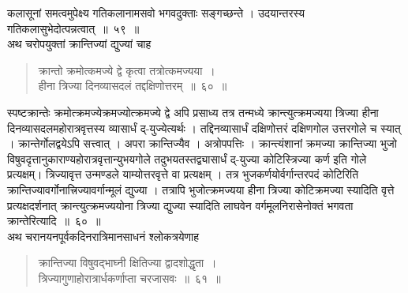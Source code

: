 \documentclass[11pt, openany]{book}
\begin{document}
\begin{sloppypar}
\noindent कलासूनां समत्वमुपेक्ष्य गतिकलानामसवो भगवदुक्ताः सङ्गच्छन्ते । उदयान्तरस्य गतिकलासुभेदोत्पन्नत्वात्~॥~५९~॥\\
\noindent अथ चरोपयुक्तां क्रान्तिज्यां द्युज्यां चाह\textendash
\end{sloppypar}
\begin{quote}

{\ssi क्रान्तो क्रमोत्कमज्ये द्वे कृत्वा तत्रोत्कमज्यया~।\\
हीना त्रिज्या दिनव्यासदलं तद्दक्षिणोत्तरम्~॥~६०~॥}
\end{quote}
\begin{sloppypar}
स्पष्टक्रान्तेः क्रमोत्क्रमज्येक्रमज्योत्क्रमज्ये द्वे अपि प्रसाध्य तत्र
तन्मध्ये क्रान्त्युत्क्रमज्यया त्रिज्या हीना दिनव्यासदलमहोरात्रवृत्तस्य व्यासार्धं द्-युज्येत्यर्थः । तद्दिनव्यासार्धं दक्षिणोत्तरं दक्षिणगोल उत्तरगोले च स्यात् । क्रान्तेर्गोलद्वयेऽपि सत्त्वात् । अपरा क्रान्तिज्यैव । अत्रोपपत्तिः । क्रान्त्यंशानां क्रमज्या क्रान्तिज्या भुजो विषुवदृत्तानुकाराण्यहोरात्रवृत्तान्युभयगोले तदुभयतस्तद्व्यासार्धं द्-युज्या कोटिस्त्रिज्या कर्ण इति गोले प्रत्यक्षम्। त्रिज्यावृत्त उन्मण्डले याम्योत्तरवृत्ते वा प्रत्यक्षम् । तत्र भुजकर्णयोर्वर्गान्तरपदं कोटिरिति क्रान्तिज्यावर्गोनात्त्रिज्यावर्गान्मूलं द्युज्या । तत्रापि भुजोत्क्रमज्यया हीना त्रिज्या कोटिक्रमज्या स्यादिति वृत्ते प्रत्यक्षदर्शनात् क्रान्त्युत्क्रमज्ययोना त्रिज्या द्युज्या स्यादिति लाघवेन वर्गमूलनिरासेनोक्तं भगवता क्रान्तेरित्यादि~॥~६०~॥\\
\noindent अथ चरानयनपूर्वकदिनरात्रिमानसाधनं श्लोकत्रयेणाह\textendash
\end{sloppypar}

\begin{quote}
{\ssi क्रान्तिज्या विषुवद्भाघ्नी क्षितिज्या द्वादशोद्धृता~।\\
त्रिज्यागुणाहोरात्रार्धकर्णाप्ता चरजासवः~॥~६१~॥}
\end{quote}
\newpage
\end{document}
